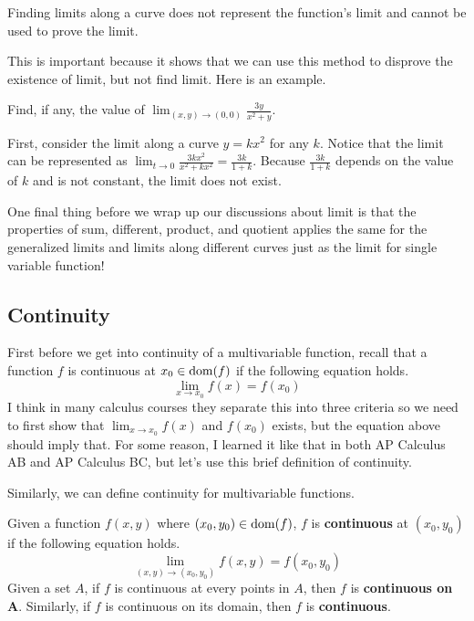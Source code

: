 \documentclass[../../../main.tex]{subfiles}
\begin{document}
\begin{important}
Finding limits along a curve does not represent the function's limit
and cannot be used to prove the limit.
\end{important}

This is important because it shows that we can use this method to
disprove the existence of limit, but not find limit. Here is an
example.

\begin{problem}{}{}
Find, if any, the value of $\lim_{(x, y) \to (0, 0)}
\frac{3y}{x^2 + y}$.
\end{problem}
\begin{solution}
First, consider the limit along a curve $y = kx^2$ for any $k$.
Notice that the limit can be represented as $\lim_{t \to 0}
\frac{3kx^2}{x^2 + kx^2} = \frac{3k}{1 + k}$. Because
$\frac{3k}{1 + k}$ depends on the value of $k$ and is not constant,
the limit does not exist.
\end{solution}

One final thing before we wrap up our discussions about limit is that
the properties of sum, different, product, and quotient applies the
same for the generalized limits and limits along different curves
just as the limit for single variable function!

\subsection{Continuity}

First before we get into continuity of a multivariable function,
recall that a function $f$ is continuous at $x_0 \in \operatorname{dom}(f)$ if the
following equation holds.
\[
\lim_{x \to x_0} f(x) = f(x_0)
\]
I think in many calculus courses they separate this into three
criteria so we need to first show that $\lim_{x \to x_0} f(x)$
and $f(x_0)$ exists, but the equation above should imply that.
For some reason, I learned it like that in both AP Calculus AB and
AP Calculus BC, but let's use this brief definition of continuity.

Similarly, we can define continuity for multivariable functions.

\begin{definition}{}{}
Given a function $f(x, y)$ where $(x_0, y_0) \in \operatorname{dom}(f)$, $f$ is
\textbf{continuous} at $(x_0, y_0)$ if the following equation holds.
\vspace{-0.5\baselineskip}
\[
\lim_{(x, y) \to (x_0, y_0)} f(x, y) = f(x_0, y_0)
\]
Given a set $A$, if $f$ is continuous at every points in $A$,
then $f$ is \textbf{continuous on $\mathbf{A}$}. Similarly,
if $f$ is continuous on its domain, then $f$ is \textbf{continuous}.
\end{definition}
\end{document}
